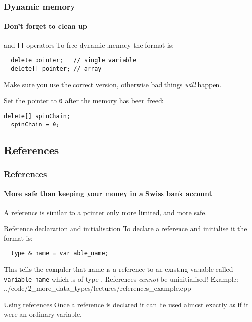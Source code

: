 \documentclass{beamer}
\begin{document}
\begin{frame}[fragile]
  \frametitle{Dynamic memory}
  \framesubtitle{Don't forget to clean up}
  
  \begin{block}{ and \texttt{[]} operators}
    To free dynamic memory the format is:
    \begin{lstlisting}
  delete pointer;   // single variable
  delete[] pointer; // array
    \end{lstlisting}
    Make sure you use the correct version, otherwise bad things \textit{will} happen.
  \end{block}
  \pause
  \pause
  \begin{doblocke}
  Set the pointer to \texttt{0} after the memory has been freed:
  \begin{lstlisting}[belowskip=0pt]
  delete[] spinChain;
  spinChain = 0;
  \end{lstlisting}
  \end{doblocke}
\end{frame}

\subsection{References}

\begin{frame}[fragile]
  \frametitle{References}
  \framesubtitle{More safe than keeping your money in a Swiss bank account}
  
  A reference is similar to a pointer only more limited, and more safe.
  \begin{block}{Reference declaration and initialisation}
	  To declare a reference and initialise it the format is:
		  \begin{lstlisting}
  type & name = variable_name;
		  \end{lstlisting}
	  This tells the compiler that name is a reference to an existing variable called \texttt{variable\_name} which is of type .  References \textit{cannot} be uninitialised!\newline
		Example:
      {../code/2_more_data_types/lectures/references_example.cpp}
  \end{block}
  \pause
  \begin{block}{Using references}
  	Once a reference is declared it can be used almost exactly as if it were an ordinary variable.
  \end{block}

\end{frame}
\end{document}
